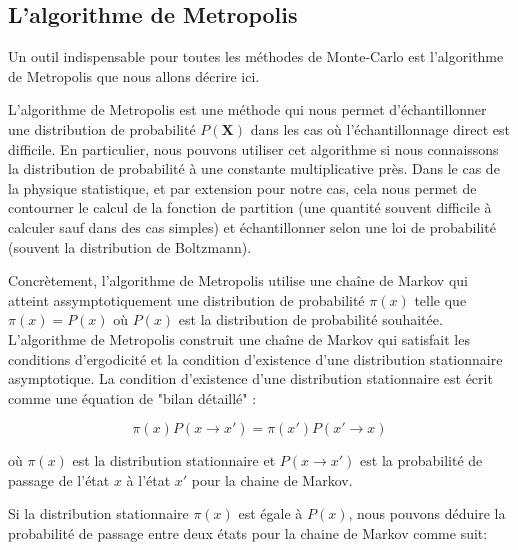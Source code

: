 \documentclass[11pt]{article}
\theoremstyle{definition}
\theoremstyle{remark}
\begin{document}
\subsection{L'algorithme de Metropolis}

Un outil indispensable pour toutes les méthodes de Monte-Carlo est l'algorithme de Metropolis que nous allons décrire ici. 

L'algorithme de Metropolis est une méthode qui nous permet d'échantillonner une distribution de probabilité $P(\mathbf{X})$ dans les cas où l’échantillonnage direct est difficile. En particulier, nous pouvons utiliser cet algorithme si nous connaissons la distribution de probabilité à une constante multiplicative près. Dans le cas de la physique statistique, et par extension pour notre cas, cela nous permet de contourner le calcul de la fonction de partition (une quantité souvent difficile à calculer sauf dans des cas simples) et échantillonner selon une loi de probabilité (souvent la distribution de Boltzmann).

Concrètement, l'algorithme de Metropolis utilise une chaîne de Markov qui atteint assymptotiquement une distribution de probabilité $\pi(x)$ telle que $\pi(x) = P(x)$ où $P(x)$ est la distribution de probabilité souhaitée. L'algorithme de Metropolis construit une chaîne de Markov qui satisfait les conditions d'ergodicité et la condition d'existence d'une distribution stationnaire asymptotique. La condition d'existence d'une distribution stationnaire est écrit comme une équation de "bilan détaillé" :

\begin{equation}
\label{detailed_balance}
\pi(x) P(x \rightarrow x') = \pi(x') P(x' \rightarrow x)
\end{equation} 

où $\pi(x)$ est la distribution stationnaire et $P(x \rightarrow x')$ est la probabilité de passage de l'état $x$ à l'état $x'$ pour la chaine de Markov.  

Si la distribution stationnaire $\pi(x)$ est égale à $P(x)$, nous pouvons déduire la probabilité de passage entre deux états pour la chaine de Markov comme suit: 
\end{document}
